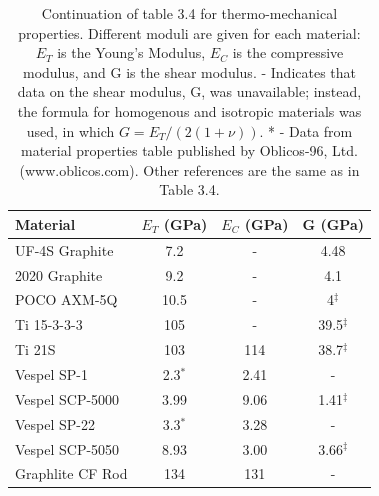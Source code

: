 \documentclass{report}
\begin{document}
\begin{table}[htb]
\begin{threeparttable}
\begin{tabular}{lccc}
\toprule
\textbf{Material} & $E_{T}$ (GPa) & $E_{C}$ (GPa) & G (GPa) \\
\midrule
 UF-4S Graphite & 7.2 & - & 4.48 \\
 2020 Graphite & 9.2 & - & 4.1 \\
 POCO AXM-5Q & 10.5 & - & 4$^{\ddag}$ \\
 Ti 15-3-3-3 & 105 & - & 39.5$^{\ddag}$ \\
 Ti 21S & 103 & 114 & 38.7$^{\ddag}$ \\
 Vespel SP-1 & 2.3$^{*}$ & 2.41 & - \\
 Vespel SCP-5000 & 3.99 & 9.06 & 1.41$^{\ddag}$\\
 Vespel SP-22 & 3.3$^{*}$ & 3.28 & - \\
 Vespel SCP-5050 & 8.93 & 3.00 & 3.66$^{\ddag}$\\
 Graphlite CF Rod & 134 & 131 & - \\
 \bottomrule
\end{tabular}
\caption{Continuation of table 3.4 for thermo-mechanical properties. Different moduli are given for each material: $E_{T}$ is the Young's Modulus, $E_{C}$ is the compressive modulus, and G is the shear modulus. \ddag - Indicates that data on the shear modulus, G, was unavailable; instead, the formula for homogenous and isotropic materials was used, in which $G = E_{T}/(2(1 + \nu))$. * - Data from material properties table published by Oblicos-96, Ltd. (www.oblicos.com). Other references are the same as in Table 3.4. }
\end{threeparttable}
\end{table}
\end{document}
